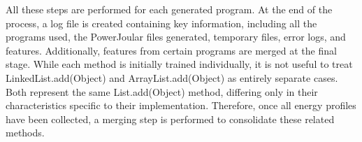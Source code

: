 All these steps are performed for each generated program. At the end of the process, a log file is created containing key information, including all the programs used, the PowerJoular files generated, temporary files, error logs, and features.
Additionally, features from certain programs are merged at the final stage. While each method is initially trained individually, it is not useful to treat LinkedList.add(Object) and ArrayList.add(Object) as entirely separate cases. Both represent the same List.add(Object) method, differing only in their characteristics specific to their implementation. Therefore, once all energy profiles have been collected, a merging step is performed to consolidate these related methods.


